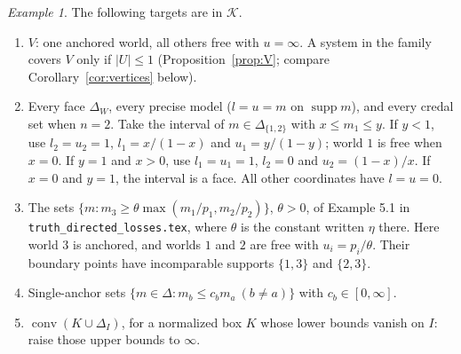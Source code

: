 \documentclass[11pt]{article}
\theoremstyle{remark}\newtheorem{remark}[theorem]{Remark}
\newtheorem{example}[theorem]{Example}
\newcommand{\K}{\mathcal K}
\newcommand{\supp}{\operatorname{supp}}
\newcommand{\conv}{\operatorname{conv}}
\begin{document}
\begin{example}\label{ex:covered}
The following targets are in $\K$.
\begin{enumerate}[label=(\roman*),leftmargin=*]
\item $V$: one anchored world, all others free with $u=\infty$. A
system in the family covers $V$ only if $|U|\le1$
(Proposition~\ref{prop:V}; compare Corollary~\ref{cor:vertices} below).
\item Every face $\Delta_W$, every precise model ($l=u=m$ on
$\supp m$), and every credal set when $n=2$. Take the interval of
$m\in\Delta_{\{1,2\}}$ with $x\le m_1\le y$. If $y<1$, use $l_2=u_2=1$,
$l_1=x/(1-x)$ and $u_1=y/(1-y)$; world $1$ is free when $x=0$. If $y=1$
and $x>0$, use $l_1=u_1=1$, $l_2=0$ and $u_2=(1-x)/x$. If $x=0$ and $y=1$,
the interval is a face. All other coordinates have $l=u=0$.
\item The sets
$\{m:m_3\ge\theta\max(m_1/p_1,m_2/p_2)\}$, $\theta>0$, of Example 5.1 in
\texttt{truth\_\allowbreak directed\_\allowbreak losses.tex}, where
$\theta$ is the constant written $\eta$ there. Here world $3$ is anchored,
and worlds $1$ and $2$ are free with $u_i=p_i/\theta$. Their boundary points have
incomparable supports $\{1,3\}$ and $\{2,3\}$.
\item Single-anchor sets $\{m\in\Delta:m_b\le c_bm_a\ (b\ne a)\}$ with
$c_b\in[0,\infty]$.
\item $\conv(K\cup\Delta_I)$, for a normalized box $K$ whose lower bounds
vanish on $I$: raise those upper bounds to $\infty$.
\end{enumerate}
\end{example}
\end{document}
